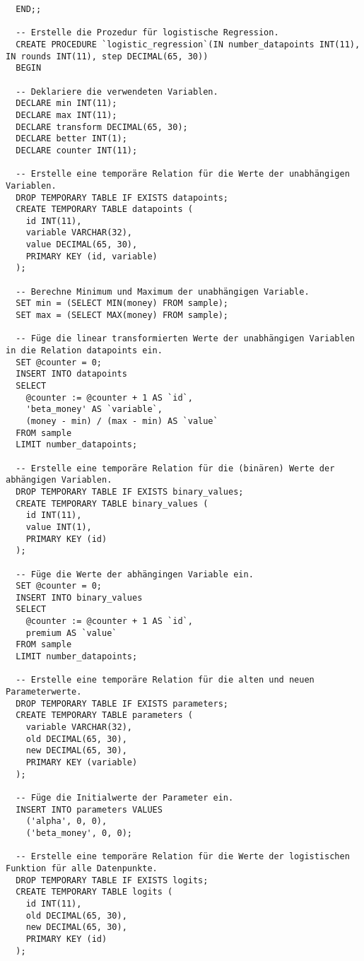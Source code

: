 \begin{verbatim}
  END;;

  -- Erstelle die Prozedur für logistische Regression.
  CREATE PROCEDURE `logistic_regression`(IN number_datapoints INT(11), IN rounds INT(11), step DECIMAL(65, 30))
  BEGIN

  -- Deklariere die verwendeten Variablen.
  DECLARE min INT(11);
  DECLARE max INT(11);
  DECLARE transform DECIMAL(65, 30);
  DECLARE better INT(1);
  DECLARE counter INT(11);

  -- Erstelle eine temporäre Relation für die Werte der unabhängigen Variablen.
  DROP TEMPORARY TABLE IF EXISTS datapoints;
  CREATE TEMPORARY TABLE datapoints (
    id INT(11),
    variable VARCHAR(32),
    value DECIMAL(65, 30),
    PRIMARY KEY (id, variable)
  );

  -- Berechne Minimum und Maximum der unabhängigen Variable.
  SET min = (SELECT MIN(money) FROM sample);
  SET max = (SELECT MAX(money) FROM sample);

  -- Füge die linear transformierten Werte der unabhängigen Variablen in die Relation datapoints ein.
  SET @counter = 0;
  INSERT INTO datapoints
  SELECT
    @counter := @counter + 1 AS `id`,
    'beta_money' AS `variable`,
    (money - min) / (max - min) AS `value`
  FROM sample
  LIMIT number_datapoints;

  -- Erstelle eine temporäre Relation für die (binären) Werte der abhängigen Variablen.
  DROP TEMPORARY TABLE IF EXISTS binary_values;
  CREATE TEMPORARY TABLE binary_values (
    id INT(11),
    value INT(1),
    PRIMARY KEY (id)
  );

  -- Füge die Werte der abhängingen Variable ein.
  SET @counter = 0;
  INSERT INTO binary_values
  SELECT
    @counter := @counter + 1 AS `id`,
    premium AS `value`
  FROM sample
  LIMIT number_datapoints;

  -- Erstelle eine temporäre Relation für die alten und neuen Parameterwerte.
  DROP TEMPORARY TABLE IF EXISTS parameters;
  CREATE TEMPORARY TABLE parameters (
    variable VARCHAR(32),
    old DECIMAL(65, 30),
    new DECIMAL(65, 30),
    PRIMARY KEY (variable)
  );

  -- Füge die Initialwerte der Parameter ein.
  INSERT INTO parameters VALUES
    ('alpha', 0, 0),
    ('beta_money', 0, 0);

  -- Erstelle eine temporäre Relation für die Werte der logistischen Funktion für alle Datenpunkte.
  DROP TEMPORARY TABLE IF EXISTS logits;
  CREATE TEMPORARY TABLE logits (
    id INT(11),
    old DECIMAL(65, 30),
    new DECIMAL(65, 30),
    PRIMARY KEY (id)
  );


\end{verbatim}
